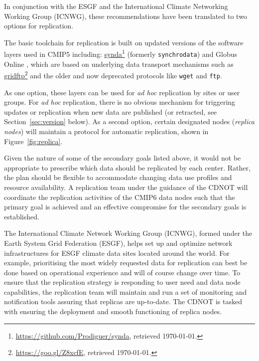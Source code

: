 \documentclass[gmd,manuscript]{copernicus}
\newcommand{\urlref}[2] {\href{#1}{#2}\footnote{\url{#1}, retrieved \today.}}
\begin{document}
In conjunction with the ESGF and the International Climate Networking
Working Group (ICNWG), these recommendations have been translated to
two options for replication.

The basic toolchain for replication is built on updated versions of
the software layers used in CMIP5 including:
\urlref{https://github.com/Prodiguer/synda}{synda} (formerly
\texttt{synchrodata}) and Globus Online \citep{ref:chardetal2015}, which
are based on underlying data transport mechanisms such as
\urlref{https://goo.gl/Z8xcfE}{gridftp} and the older and now deprecated
protocols like \texttt{wget} and \texttt{ftp}.

As one option, these layers can be used for \emph{ad hoc} replication by
sites or user groups. For \emph{ad hoc} replication, there is no
obvious mechanism for triggering updates or replication when new data
are published (or retracted, see Section~\ref{sec:version} below).
As a second option, certain designated nodes (\emph{replica nodes}) will maintain a protocol
for automatic replication, shown in Figure~\ref{fig:replica}.

\begin{figure*}
  \begin{center}
  \end{center}
  \caption{CMIP6 replication from data nodes to replica centers and
    between replica centers coordinated by a CMIP6 replication team,
    under the guidance of the CDNOT.}
  \label{fig:replica}
\end{figure*}

Given the nature of some of the secondary goals listed above, it would
not be appropriate to prescribe which data should be replicated by
each center. Rather, the plan should be flexible to accommodate
changing data use profiles and resource availability.
A replication team under the guidance of the CDNOT will coordinate the
replication activities of the CMIP6 data nodes such that the primary
goal is achieved and an effective compromise for the secondary goals
is established.

The International Climate Network Working Group (ICNWG), formed under
the Earth System Grid Federation (ESGF), helps set up and optimize
network infrastructures for ESGF climate data sites located around the
world. For example, prioritising the most widely requested data for
replication can best be done based on operational experience and will
of course change over time. To ensure that the replication strategy is
responding to user need and data node capabilities, the replication
team will maintain and run a set of monitoring and notification tools
assuring that replicas are up-to-date. The CDNOT is tasked with
ensuring the deployment and smooth functioning of replica nodes.
\end{document}
